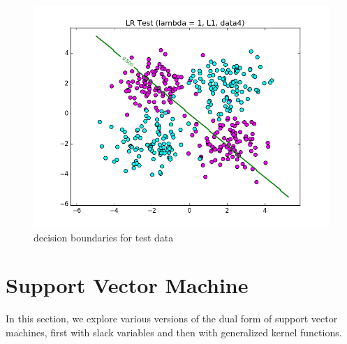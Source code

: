 \documentclass{article}
\begin{document}
\begin{figure}[width=\linewidth]
\begin{multicols}{2}
  \includegraphics[width=1.2\linewidth]{Part1_data4_test.png}
\end{multicols}
\caption{decision boundaries for test data}
\end{figure}


\section{Support Vector Machine}
In this section, we explore various versions of the dual form of support vector machines, first with slack variables and then with generalized kernel functions.
\end{document}
